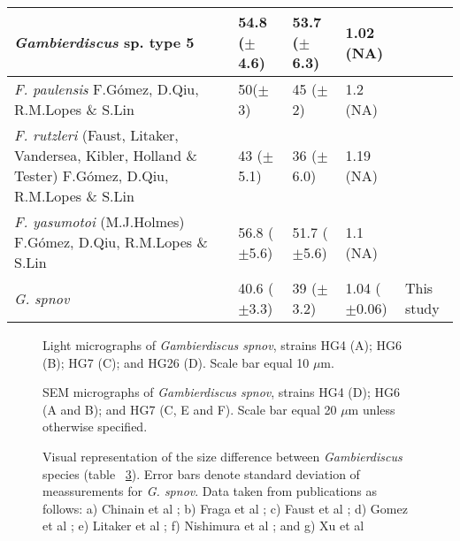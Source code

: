 \documentclass[12pt]{article}
\begin{document}
\begin{table}
\begin{tabular}{ | p{3.5cm} | p{2cm} | p{2cm} | p{2.5cm} | p{1.5cm}| }
 \hline
 \emph{Gambierdiscus} sp. type 5 & 54.8 ($\pm$4.6)	& 53.7 ($\pm$6.3)& 1.02 (NA) & \citep{xu2014distribution} \\
 \hline
 \textit{F. paulensis} F.Gómez, D.Qiu, R.M.Lopes \& S.Lin & 50($\pm$3) & 45 ($\pm$2) & 1.2 (NA) & \citep{gomez2015fukuyoa} \\
 \hline
\textit{F. rutzleri }(Faust, Litaker, Vandersea, Kibler, Holland \& Tester) F.Gómez, D.Qiu, R.M.Lopes \& S.Lin& 43 ($\pm$5.1)	& 36 ($\pm$6.0) & 1.19 (NA) & \citep{litaker2009taxonomy}\\
 \hline
\textit{F. yasumotoi }(M.J.Holmes) F.Gómez, D.Qiu, R.M.Lopes \& S.Lin& 56.8 ($\pm$5.6)	& 51.7 ($\pm$5.6) & 1.1 (NA) & \citep{litaker2009taxonomy} \\
 \hline
\textit{G. spnov}  & 40.6 ($\pm$3.3) & 39 ($\pm$3.2) & 1.04 ($\pm$0.06) & This study \\
   \hline
\end{tabular}
\end{table}

\FloatBarrier 
\begin{figure} 
\caption{Light micrographs of \emph{Gambierdiscus spnov}, strains HG4 (A); HG6 (B); HG7 (C); and HG26 (D). Scale bar equal 10 $\mu$m.​} 
\label{fig:PetLM}
\end{figure} 

\FloatBarrier 
\begin{figure} 
\caption{SEM micrographs of \emph{Gambierdiscus spnov}, strains HG4 (D); HG6 (A and B); and HG7 (C, E and F). Scale bar equal 20 $\mu$m unless otherwise specified.} 
\label{fig:PetSEM}
\end{figure} 

\FloatBarrier 
\begin{figure} 
\caption{Visual representation of the size difference between \emph{Gambierdiscus} species (table ~\ref{fig:SizeGraph}). Error bars denote standard deviation of meassurements for \emph{G. spnov}. Data taken from publications as follows: a) Chinain et al \citep{chinain1999morphology}; b) Fraga et al \citep{fraga2014genus}; c) Faust et al \citep{faust1995observation}; d) Gomez et al \citep{gomez2015fukuyoa}; e) Litaker et al \citep{litaker2009taxonomy}; f) Nishimura et al \citep{nishimura2014morphology}; and g) Xu et al \citep{xu2014distribution}} 
\label{fig:SizeGraph}
\end{figure} 
\end{document}
